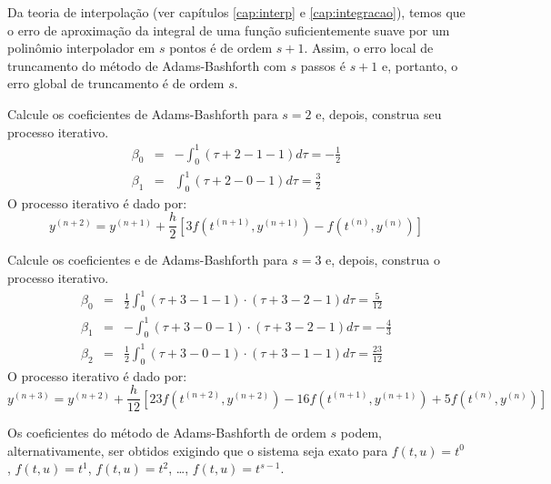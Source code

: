 \begin{obs} Da teoria de interpolação (ver capítulos \ref{cap:interp} e \ref{cap:integracao}), temos que o erro de aproximação da integral de uma função suficientemente suave por um polinômio interpolador em $s$ pontos é de ordem $s+1$. Assim, o erro local de truncamento do método de Adams-Bashforth com $s$ passos é $s+1$ e, portanto, o erro global de truncamento é de ordem $s$.
\end{obs}


\begin{ex} Calcule os coeficientes de Adams-Bashforth para $s=2$ e, depois, construa seu processo iterativo.
 \begin{eqnarray}
  \beta_0&=&-\int_0^1 (\tau+2-1-1)d\tau=-\frac{1}{2}\\
  \beta_1&=&\int_0^1 (\tau+2-0-1)d\tau=\frac{3}{2}
 \end{eqnarray}
 O processo iterativo é dado por:
 \begin{equation}
  y^{(n+2)}=y^{(n+1)}+\frac{h}{2}\left[3f\left(t^{(n+1)},y^{(n+1)}\right)-f\left(t^{(n)},y^{(n)}\right)\right]
 \end{equation}
\end{ex}


\begin{ex} Calcule os coeficientes e de Adams-Bashforth para $s=3$ e, depois, construa o processo iterativo.
 \begin{eqnarray}
  \beta_0&=&\frac{1}{2}\int_0^1 {(\tau+3-1-1)}\cdot {(\tau+3-2-1)} d\tau=\frac{5}{12}\\
  \beta_1&=&-\int_0^1 {(\tau+3-0-1)}\cdot {(\tau+3-2-1)} d\tau=-\frac{4}{3}\\
  \beta_2&=&\frac{1}{2}\int_0^1 {(\tau+3-0-1)}\cdot {(\tau+3-1-1)} d\tau=\frac{23}{12}
 \end{eqnarray}
 O processo iterativo é dado por:
 \begin{equation}
  y^{(n+3)}=y^{(n+2)}+\frac{h}{12}\left[23f\left(t^{(n+2)},y^{(n+2)}\right)-16f\left(t^{(n+1)},y^{(n+1)}\right)+5f\left(t^{(n)},y^{(n)}\right)\right]
 \end{equation}
\end{ex}

\begin{obs} Os coeficientes do método de Adams-Bashforth de ordem $s$ podem, alternativamente, ser obtidos exigindo que o sistema seja exato para $f(t,u)=t^0$, $f(t,u)=t^1$, $f(t,u)=t^2$, \ldots, $f(t,u)=t^{s-1}$.

\end{obs}

